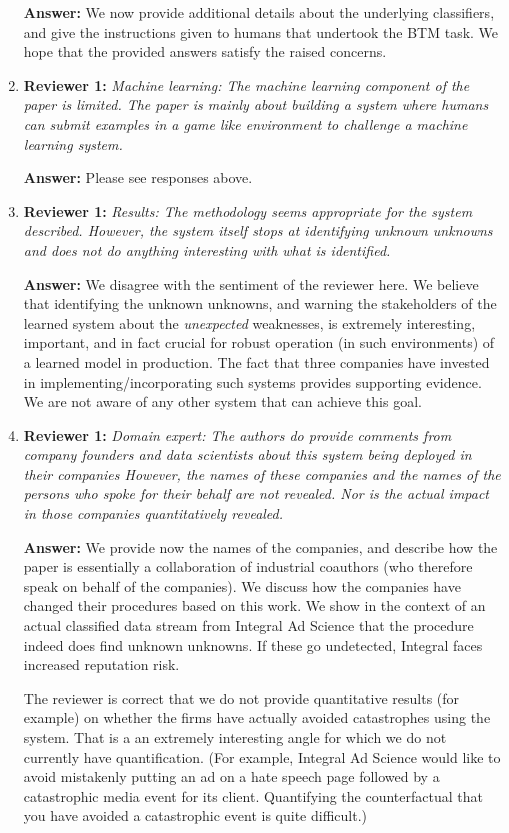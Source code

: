 \documentclass[letterpaper]{article}
\begin{document}
\begin{enumerate}
\textbf{Answer:} We now provide additional details about the underlying classifiers, and give the instructions given to humans that undertook the BTM task. We hope that the provided answers satisfy the raised concerns.

\item \textbf{Reviewer 1:} \emph{ Machine learning: The machine learning component of the paper is limited. The paper is mainly about building a system where humans can submit examples in a game like environment to challenge a machine learning system.}

\textbf{Answer:} Please see responses above.

\item \textbf{Reviewer 1:} \emph{Results: The methodology seems appropriate for the system described. However, the system itself stops at identifying unknown unknowns and does not do anything interesting with what is identified.}

\textbf{Answer:} We disagree with the sentiment of the reviewer here.  We believe that identifying the unknown unknowns, and warning the stakeholders of the learned system about the \emph{unexpected} weaknesses, is extremely interesting, important, and in fact crucial for robust operation (in such environments) of a learned model in production.  The fact that three companies have invested in implementing/incorporating such systems provides supporting evidence.  We are not aware of any other system that can achieve this goal.

\item \textbf{Reviewer 1:} \emph{Domain expert: The authors do provide comments from company founders and data scientists about this system being deployed in their companies However, the names of these companies and the names of the persons who spoke for their behalf are not revealed. Nor is the actual impact in those companies quantitatively revealed.}

\textbf{Answer:} We provide now the names of the companies, and describe how the paper is essentially a collaboration of industrial coauthors (who therefore speak on behalf of the companies).  We discuss how the companies have changed their procedures based on this work.  We show in the context of an actual classified data stream from Integral Ad Science that the procedure indeed does find unknown unknowns.  If these go undetected, Integral faces increased reputation risk.

The reviewer is correct that we do not provide quantitative results (for example) on whether the firms have actually avoided catastrophes using the system.  That is a an extremely interesting angle for which we do not currently have quantification.  (For example, Integral Ad Science would like to avoid mistakenly putting an ad on a hate speech page followed by a catastrophic media event for its client.  Quantifying the counterfactual that you have avoided a catastrophic event is quite difficult.)  


\end{enumerate}
\end{document}
